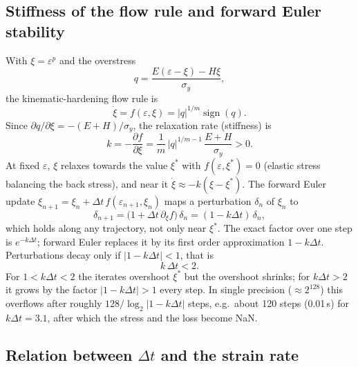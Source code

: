 \documentclass[11pt]{article}
\begin{document}
\subsection{Stiffness of the flow rule and forward Euler stability}
With $\xi=\varepsilon^p$ and the overstress
\begin{equation}
    q = \frac{E(\varepsilon-\xi) - H\xi}{\sigma_y},
\end{equation}
the kinematic-hardening flow rule is
\begin{equation}
    \dot\xi = f(\varepsilon,\xi) = |q|^{1/m}\operatorname{sign}(q).
\end{equation}
Since $\partial q/\partial\xi = -(E+H)/\sigma_y$, the relaxation rate
(stiffness) is
\begin{equation}
    k = -\frac{\partial f}{\partial\xi}
    = \frac{1}{m}\,|q|^{1/m-1}\,\frac{E+H}{\sigma_y} > 0 .
\end{equation}
At fixed $\varepsilon$, $\xi$ relaxes towards the value $\xi^*$ with
$f(\varepsilon,\xi^*)=0$ (elastic stress balancing the back stress), and
near it $\dot\xi\approx -k(\xi-\xi^*)$. The forward Euler update
$\xi_{n+1}=\xi_n+\Delta t\,f(\varepsilon_{n+1},\xi_n)$ maps a perturbation
$\delta_n$ of $\xi_n$ to
\begin{equation}
    \delta_{n+1} = \bigl(1+\Delta t\,\partial_\xi f\bigr)\,\delta_n
    = (1-k\Delta t)\,\delta_n ,
\end{equation}
which holds along any trajectory, not only near $\xi^*$. The exact factor
over one step is $e^{-k\Delta t}$; forward Euler replaces it by its first
order approximation $1-k\Delta t$. Perturbations decay only if
$|1-k\Delta t|<1$, that is
\begin{equation}
    k\,\Delta t < 2 .
\end{equation}
For $1<k\Delta t<2$ the iterates overshoot $\xi^*$ but the overshoot
shrinks; for $k\Delta t>2$ it grows by the factor $|1-k\Delta t|>1$ every
step. In single precision ($\approx 2^{128}$) this overflows after roughly
$128/\log_2|1-k\Delta t|$ steps, e.g.\ about 120 steps (0.01\,s) for
$k\Delta t=3.1$, after which the stress and the loss become NaN.

\subsection{Relation between \texorpdfstring{$\Delta t$}{dt} and the strain rate}
\label{sec:dt-strain-rate}
\end{document}
